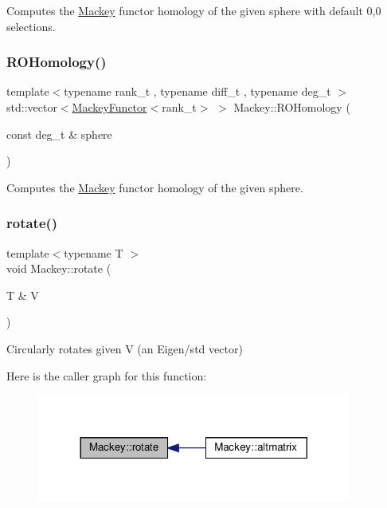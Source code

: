 Computes the \hyperlink{namespaceMackey}{Mackey} functor homology of the given sphere with default 0,0 selections. 

\mbox{\label{namespaceMackey_a58708ee937b0c4172b7cde8e5f856504}} 
\subsubsection{\texorpdfstring{R\+O\+Homology()}{ROHomology()}}
{\footnotesize\ttfamily template$<$typename rank\+\_\+t , typename diff\+\_\+t , typename deg\+\_\+t $>$ \\
std\+::vector$<$\hyperlink{classMackey_1_1MackeyFunctor}{Mackey\+Functor}$<$rank\+\_\+t$>$ $>$ Mackey\+::\+R\+O\+Homology (\begin{DoxyParamCaption}\item[{const deg\+\_\+t \&}]{sphere }\end{DoxyParamCaption})}



Computes the \hyperlink{namespaceMackey}{Mackey} functor homology of the given sphere. 

\mbox{\label{namespaceMackey_a38a833de54971845cbdb8c96f830725b}} 
\subsubsection{\texorpdfstring{rotate()}{rotate()}}
{\footnotesize\ttfamily template$<$typename T $>$ \\
void Mackey\+::rotate (\begin{DoxyParamCaption}\item[{T \&}]{V }\end{DoxyParamCaption})}



Circularly rotates given V (an Eigen/std vector) 

Here is the caller graph for this function\+:\nopagebreak
\begin{figure}[H]
\begin{center}
\leavevmode
\includegraphics[width=293pt]{namespaceMackey_a38a833de54971845cbdb8c96f830725b_icgraph}
\end{center}
\end{figure}
\mbox{\label{namespaceMackey_aab8a6292210a3b71960cb03b79d218e6}} 
